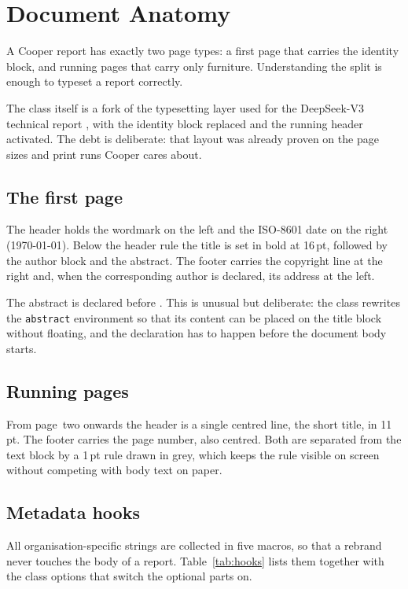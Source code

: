 \section{Document Anatomy}
\label{sec:anatomy}

A Cooper report has exactly two page types: a first page that carries the identity block, and
running pages that carry only furniture. Understanding the split is enough to typeset a report
correctly.

The class itself is a fork of the typesetting layer used for the DeepSeek-V3 technical report
\citep{deepseek2024}, with the identity block replaced and the running header activated. The
debt is deliberate: that layout was already proven on the page sizes and print runs Cooper
cares about.

\subsection{The first page}

The header holds the wordmark on the left and the ISO-8601 date on the right
(\monthyeardate\today). Below the header rule the title is set in bold at 16\,pt, followed by the author
block and the abstract. The footer carries the copyright line at the right and, when the
corresponding author is declared, its address at the left.

The abstract is declared before \verb||. This is unusual but deliberate: the
class rewrites the \texttt{abstract} environment so that its content can be placed on the title
block without floating, and the declaration has to happen before the document body starts.

\subsection{Running pages}

From page~two onwards the header is a single centred line, the short title, in 11\,pt. The
footer carries the page number, also centred. Both are separated from the text block by a 1\,pt
rule drawn in grey, which keeps the rule visible on screen without competing with body text on
paper.

\subsection{Metadata hooks}

All organisation-specific strings are collected in five macros, so that a rebrand never touches
the body of a report. Table~\ref{tab:hooks} lists them together with the class options that
switch the optional parts on.

